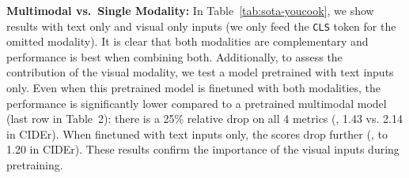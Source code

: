\documentclass[10pt,twocolumn,letterpaper]{article}
\begin{document}
\noindent\textbf{Multimodal vs.\ Single Modality:}
In Table~\ref{tab:sota-youcook}, we show results with text only and visual only inputs (we only feed the \texttt{CLS} token for the omitted modality). It is clear that both modalities are complementary and performance is best when combining both.
Additionally, to assess the contribution of the visual modality, we test a model pretrained with text inputs only. Even when this pretrained model is finetuned with both modalities, the performance is significantly lower compared to a pretrained multimodal model (last row in Table~2): there is a 25\% relative drop on all 4 metrics (\eg, 1.43 vs. 2.14 in CIDEr).
When finetuned with text inputs only, the scores drop further (\eg, to 1.20 in CIDEr). These results confirm the importance of the visual inputs during pretraining.

\begin{table}[t]
    \centering
    \caption{Comparison to SOTA on YouCook2 for video captioning. 
    }
    \label{tab:sota-youcook}
\end{table}
\end{document}
